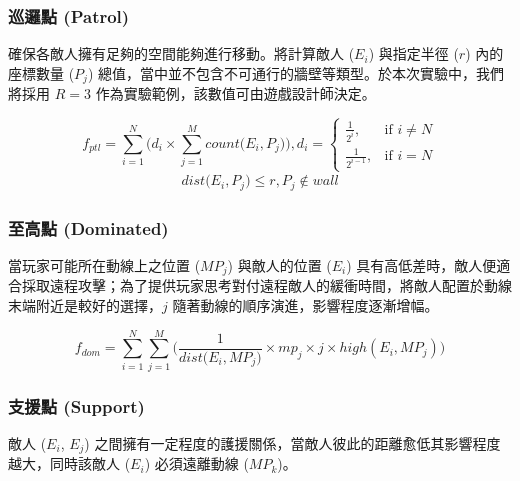 \subsubsection{巡邏點 (Patrol)}
\label{sssec:method-segments-fitnesses-patrol}

確保各敵人擁有足夠的空間能夠進行移動。將計算敵人 ($E_{i}$) 與指定半徑 ($r$) 內的座標數量 ($P_j$) 總值，當中並不包含不可通行的牆壁等類型。於本次實驗中，我們將採用 $R=3$ 作為實驗範例，該數值可由遊戲設計師決定。

\begin{equation}
    f_{ptl} = \sum_{i=1}^{N} \Big( d_{i} \times \sum_{j=1}^{M} count\big(E_{i}, P_{j}\big) \Big), 
    d_{i} = \begin{cases}
                \frac{1}{2^{i}},   & \mbox{if } i \neq N \\
                \frac{1}{2^{i-1}}, & \mbox{if } i = N
            \end{cases}
\end{equation}
\begin{gather*}
    dist\big(E_{i}, P_{j}\big) \leq r,  P_{j} \notin wall
\end{gather*}

\subsubsection{至高點 (Dominated)}
\label{sssec:method-segments-fitnesses-dominated}

當玩家可能所在動線上之位置 ($MP_{j}$) 與敵人的位置 ($E_{i}$) 具有高低差時，敵人便適合採取遠程攻擊；為了提供玩家思考對付遠程敵人的緩衝時間，將敵人配置於動線末端附近是較好的選擇，$j$ 隨著動線的順序演進，影響程度逐漸增幅。

\begin{equation}
f_{dom}=\sum_{i=1}^{N} \sum_{j=1}^{M} \Big( \frac{1}{dist\big(E_{i}, MP_{j}\big)} \times mp_{j} \times j \times high(E_{i}, MP_{j}) \Big)
\end{equation}

\subsubsection{支援點 (Support)}
\label{sssec:method-segments-fitnesses-support}

敵人 ($E_{i}$, $E_{j}$) 之間擁有一定程度的護援關係，當敵人彼此的距離愈低其影響程度越大，同時該敵人 ($E_{i}$) 必須遠離動線 ($MP_{k}$)。

